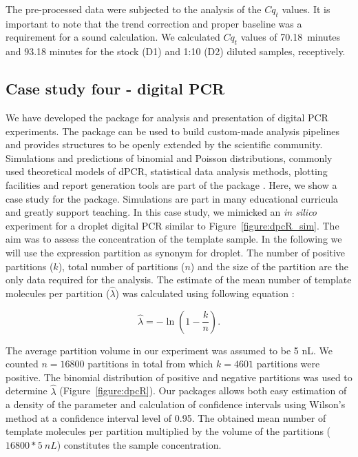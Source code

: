 The pre-processed data were subjected to the analysis of the $Cq_{t}$ values. 
It is important to note that the trend correction and proper baseline was a 
requirement for a sound calculation. We calculated $Cq_{t}$ values of 
70.18~minutes and 93.18 minutes for the stock (D1) and 1:10 (D2) diluted 
samples, receptively.

\subsection{Case study four - digital PCR}

We have developed the  package for analysis and presentation of 
digital PCR experiments. The  package can be used to build 
custom-made analysis pipelines and provides structures to be openly extended by 
the scientific community. Simulations and predictions of binomial and Poisson 
distributions, commonly used theoretical models of dPCR, statistical data 
analysis methods, plotting facilities and report generation tools are part of 
the package \citep{pabinger_2014}. Here, we show a case study for the 
 package. Simulations are part in many educational curricula and 
greatly support teaching. In this case study, we mimicked an \textit{in silico} 
experiment for a droplet digital PCR similar to Figure~\ref{figure:dpcR_sim}. 
The aim was to assess the concentration of the template sample. In the following 
we will use the expression partition as synonym for droplet. The number of 
positive partitions ($k$), total number of partitions ($n$) and the size of the 
partition are the only data required for the analysis. The estimate of the mean 
number of template molecules per partition ($\hat \lambda$) was calculated using 
following equation \citep{huggett_2013}:

\begin{equation}
\hat{\lambda} =  -\ln{(1 - \frac{k}{n})}.
\end{equation}

The average partition volume in our experiment was assumed to be 5 nL. We 
counted $n = 16800$ partitions in total from which $k = 4601$ partitions were 
positive. The binomial distribution of positive and negative partitions was used 
to determine $\hat \lambda$ (Figure~\ref{figure:dpcR}). Our packages allows both 
easy estimation of a density of the parameter and calculation of confidence 
intervals using Wilson's method \citep{brown_2001} at a confidence interval 
level of 0.95. The obtained mean number of template molecules per partition 
multiplied by the volume of the partitions ($ 16800 * 5~nL$) constitutes the 
sample concentration.

